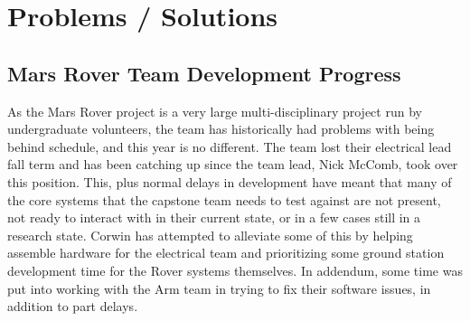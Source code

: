 \section{Problems / Solutions}
\subsection{Mars Rover Team Development Progress}
As the Mars Rover project is a very large multi-disciplinary project run by undergraduate volunteers, the team has historically had problems with being behind schedule, and this year is no different. The team lost their electrical lead fall term and has been catching up since the team lead, Nick McComb, took over this position. This, plus normal delays in development have meant that many of the core systems that the capstone team needs to test against are not present, not ready to interact with in their current state, or in a few cases still in a research state. Corwin has attempted to alleviate some of this by helping assemble hardware for the electrical team and prioritizing some ground station development time for the Rover systems themselves. In addendum, some time was put into working with the Arm team in trying to fix their software issues, in addition to part delays.